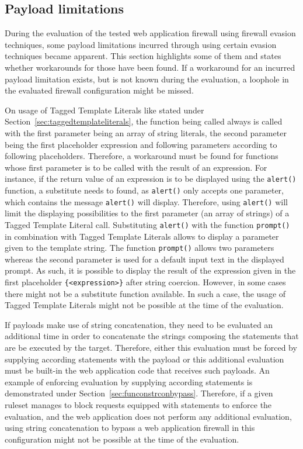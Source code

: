 \subsection{Payload limitations}
\label{sec:payloadlimitations}
During the evaluation of the tested web application firewall using firewall evasion techniques, some payload limitations incurred through using certain evasion techniques became apparent. This section highlights some of them and states whether workarounds for those have been found. If a workaround for an incurred payload limitation exists, but is not known during the evaluation, a loophole in the evaluated firewall configuration might be missed.

On usage of Tagged Template Literals like stated under Section~\ref{sec:taggedtemplateliterals}, the function being called always is called with the first parameter being an array of string literals, the second parameter being the first placeholder expression and following parameters according to following placeholders. Therefore, a workaround must be found for functions whose first parameter is to be called with the result of an expression.
For instance, if the return value of an expression is to be displayed using the \verb|alert()| function, a substitute needs to found, as \verb|alert()| only accepts one parameter, which contains the message \verb|alert()| will display. \cite{js/alert} 
Therefore, using \verb|alert()| will limit the displaying possibilities to the first parameter (an array of strings) of a Tagged Template Literal call. Substituting \verb|alert()| with the function \verb|prompt()| in combination with Tagged Template Literals allows to display a parameter given to the template string. The function \verb|prompt()| allows two parameters whereas the second parameter is used for a default input text in the displayed prompt. \cite{js/prompt} 
As such, it is possible to display the result of the expression given in the first placeholder {\verb|{<expression>}|} after string coercion.
However, in some cases there might not be a substitute function available. In such a case, the usage of Tagged Template Literals might not be possible at the time of the evaluation.

If payloads make use of string concatenation, they need to be evaluated an additional time in order to concatenate the strings composing the statements that are be executed by the target. Therefore, either this evaluation must be forced by supplying according statements with the payload or this additional evaluation must be built-in the web application code that receives such payloads. An example of enforcing evaluation by supplying according statements is demonstrated under Section~\ref{sec:funconstrconbypass}. 
Therefore, if a given ruleset manages to block requests equipped with statements to enforce the evaluation, and the web application does not perform any additional evaluation, using string concatenation to bypass a web application firewall in this configuration might not be possible at the time of the evaluation.

